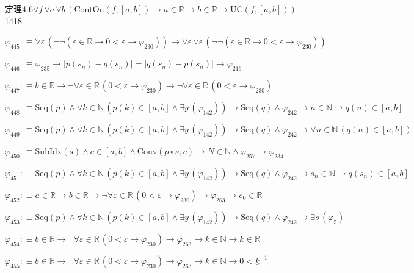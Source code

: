 \begin{fullproof}{定理4.6}{$\forall f\,\forall a\,\forall b\,(\mathrm{ContOn}(f,[a,b]) \to a \in \mathbb{R} \to b \in \mathbb{R} \to \mathrm{UC}(f,[a,b]))$}{1418}
\begin{abbrevlist}
\item $\varphi_{445} :\equiv \forall \varepsilon\,(\neg \neg (\varepsilon \in \mathbb{R} \to 0 < \varepsilon \to \varphi_{230})) \to \forall \varepsilon\,\forall \varepsilon\,(\neg \neg (\varepsilon \in \mathbb{R} \to 0 < \varepsilon \to \varphi_{230}))$
\item $\varphi_{446} :\equiv \varphi_{235} \to \lvert p(s_{n}) - q(s_{n}) \rvert = \lvert q(s_{n}) - p(s_{n}) \rvert \to \varphi_{216}$
\item $\varphi_{447} :\equiv b \in \mathbb{R} \to \neg \forall \varepsilon \in \mathbb{R}\,(0 < \varepsilon \to \varphi_{230}) \to \neg \forall \varepsilon \in \mathbb{R}\,(0 < \varepsilon \to \varphi_{230})$
\item $\varphi_{448} :\equiv \mathrm{Seq}(p) \land \forall k \in \mathbb{N}\,(p(k) \in [a,b] \land \exists y\,(\varphi_{142})) \to \mathrm{Seq}(q) \land \varphi_{242} \to n \in \mathbb{N} \to q(n) \in [a,b]$
\item $\varphi_{449} :\equiv \mathrm{Seq}(p) \land \forall k \in \mathbb{N}\,(p(k) \in [a,b] \land \exists y\,(\varphi_{142})) \to \mathrm{Seq}(q) \land \varphi_{242} \to \forall n \in \mathbb{N}\,(q(n) \in [a,b])$
\item $\varphi_{450} :\equiv \mathrm{SubIdx}(s) \land c \in [a,b] \land \mathrm{Conv}(p \circ s,c) \to N \in \mathbb{N} \land \varphi_{257} \to \varphi_{234}$
\item $\varphi_{451} :\equiv \mathrm{Seq}(p) \land \forall k \in \mathbb{N}\,(p(k) \in [a,b] \land \exists y\,(\varphi_{142})) \to \mathrm{Seq}(q) \land \varphi_{242} \to s_{n} \in \mathbb{N} \to q(s_{n}) \in [a,b]$
\item $\varphi_{452} :\equiv a \in \mathbb{R} \to b \in \mathbb{R} \to \neg \forall \varepsilon \in \mathbb{R}\,(0 < \varepsilon \to \varphi_{230}) \to \varphi_{263} \to e_{0} \in \mathbb{R}$
\item $\varphi_{453} :\equiv \mathrm{Seq}(p) \land \forall k \in \mathbb{N}\,(p(k) \in [a,b] \land \exists y\,(\varphi_{142})) \to \mathrm{Seq}(q) \land \varphi_{242} \to \exists s\,(\varphi_{5})$
\item $\varphi_{454} :\equiv b \in \mathbb{R} \to \neg \forall \varepsilon \in \mathbb{R}\,(0 < \varepsilon \to \varphi_{230}) \to \varphi_{263} \to k \in \mathbb{N} \to \underline{k} \in \mathbb{R}$
\item $\varphi_{455} :\equiv b \in \mathbb{R} \to \neg \forall \varepsilon \in \mathbb{R}\,(0 < \varepsilon \to \varphi_{230}) \to \varphi_{263} \to k \in \mathbb{N} \to 0 < \underline{k}^{-1}$

\end{abbrevlist}
\end{fullproof}

